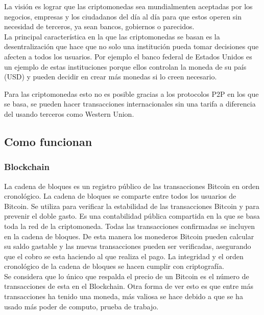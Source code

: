 \documentclass[12pt,letterpaper]{article}
\begin{document}
	La visi\'on es lograr que las criptomonedas sea mundialmenten aceptadas por los negocios, empresas y los ciudadanos del d\'ia al d\'ia para que estos operen sin necesidad de terceros, ya sean bancos, gobiernos o parecidos. 	
    \\
	
    La principal caracter\'istica en la que las criptomonedas se basan es la desentralizaci\'on que hace que no solo una instituci\'on pueda tomar decisiones que afecten a todos los usuarios. Por ejemplo el banco federal de Estados Unidos es un ejemplo de estas instituciones porque ellos controlan la moneda de su pa\'is (USD) y pueden decidir en crear m\'as monedas si lo creen necesario.

    Para las criptomonedas esto no es posible gracias a los protocolos P2P en los que se basa, se pueden hacer transacciones internacionales sin una tarifa a diferencia del usando terceros como Western Union.

	\subsection*{Como funcionan}
	
		\subsubsection*{Blockchain}

    La cadena de bloques es un registro p\'ublico de las transacciones Bitcoin en orden cronol\'ogico. La cadena de bloques se comparte entre todos los usuarios de Bitcoin. Se utiliza para verificar la estabilidad de las transacciones Bitcoin y para prevenir el doble gasto. Es una contabilidad p\'ublica compartida en la que se basa toda la red de la criptomoneda. Todas las transacciones confirmadas se incluyen en la cadena de bloques. De esta manera los monederos Bitcoin pueden calcular su saldo gastable y las nuevas transacciones pueden ser verificadas, asegurando que el cobro se esta haciendo al que realiza el pago. La integridad y el orden cronol\'ogico de la cadena de bloques se hacen cumplir con criptograf\'ia.
    \\

Se considera que lo \'unico que respalda el precio de un Bitcoin es el n\'umero de transacciones de esta en el Blockchain. Otra forma de ver esto es que entre m\'as transacciones ha tenido una moneda, m\'as valiosa se hace debido a que se ha usado m\'as poder de computo, prueba de trabajo.
    \\
		
\end{document}
